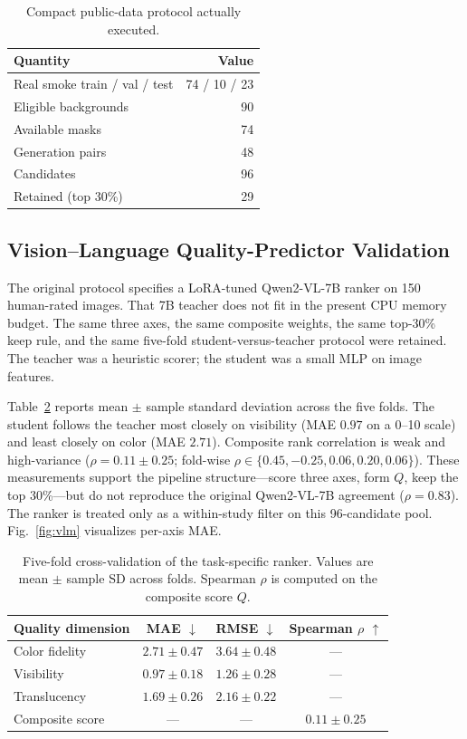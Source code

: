\begin{table}[!t]
\centering
\caption{Compact public-data protocol actually executed.}
\label{tab:protocol}
\begin{tabular}{lr}
\hline
Quantity & Value \\
\hline
Real smoke train / val / test & 74 / 10 / 23 \\
Eligible backgrounds & 90 \\
Available masks & 74 \\
Generation pairs & 48 \\
Candidates & 96 \\
Retained (top 30\%) & 29 \\
\hline
\end{tabular}
\end{table}

\subsection{Vision--Language Quality-Predictor Validation}
\label{sec:results-vlm}

The original protocol specifies a LoRA-tuned Qwen2-VL-7B ranker on 150
human-rated images. That 7B teacher does not fit in the present CPU memory
budget. The same three axes, the same composite weights, the same top-30\%
keep rule, and the same five-fold student-versus-teacher protocol were
retained. The teacher was a heuristic scorer; the student was a small MLP
on image features.

Table~\ref{tab:vlm} reports mean \(\pm\) sample standard deviation across
the five folds. The student follows the teacher most closely on visibility
(MAE \(0.97\) on a 0--10 scale) and least closely on color (MAE \(2.71\)).
Composite rank correlation is weak and high-variance
(\(\rho=0.11\pm 0.25\); fold-wise
\(\rho\in\{0.45,-0.25,0.06,0.20,0.06\}\)).
These measurements support the pipeline structure---score three axes, form
\(Q\), keep the top 30\%---but do not reproduce the original Qwen2-VL-7B
agreement (\(\rho=0.83\)). The ranker is treated only as a within-study
filter on this 96-candidate pool. Fig.~\ref{fig:vlm} visualizes per-axis MAE.

\begin{table}[!t]
\centering
\caption{Five-fold cross-validation of the task-specific ranker.
Values are mean \(\pm\) sample SD across folds.
Spearman \(\rho\) is computed on the composite score \(Q\).}
\label{tab:vlm}
\begin{tabular}{lccc}
\hline
Quality dimension & MAE \(\downarrow\) & RMSE \(\downarrow\) & Spearman \(\rho\) \(\uparrow\) \\
\hline
Color fidelity & \(2.71\pm 0.47\) & \(3.64\pm 0.48\) & --- \\
Visibility & \(0.97\pm 0.18\) & \(1.26\pm 0.28\) & --- \\
Translucency & \(1.69\pm 0.26\) & \(2.16\pm 0.22\) & --- \\
Composite score & --- & --- & \(0.11\pm 0.25\) \\
\hline
\end{tabular}
\end{table}

